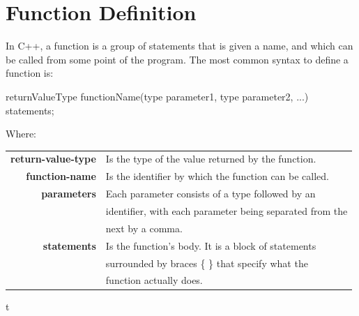 \documentclass[../lecture4-functions.tex]{subfiles}
\begin{document}
\section{Function Definition}


\begin{frame}[fragile]{}
    In C++, a function is a group of statements that is given a name, and which can be called from some point of the program. The most common syntax to define a function is: \newline

\begin{cppcode}
returnValueType functionName(type parameter1, type parameter2, ...)
{
    statements;
}
\end{cppcode}

    \vspace{0.5cm}
    Where:
    \begin{tabular}{rl}
        \textbf{return-value-type} & Is the type of the value returned by the function. \\
        \textbf{function-name}     & Is the identifier by which the function can be called. \\
        \textbf{parameters}        & Each parameter consists of a type followed by an \\
                                   & identifier,  with each parameter being separated from the \\
                                   & next by a comma. \\
        \textbf{statements}        & Is the function's body. It is a block of statements \\
                                   & surrounded by braces \{ \} that specify what the \\
                                   & function actually does. \\
    \end{tabular}
\end{frame}


\begin{frame}[fragile]{}
t
\end{frame}

\end{document}
